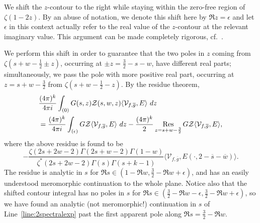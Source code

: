 We shift the $z$-contour to the right while staying within the zero-free region of
$\zeta(1 - 2z)$.
By an abuse of notation, we denote this shift here by $\Re z = \epsilon$ and let
$\epsilon$ in this context actually refer to the real value of the $z$-contour at the
relevant imaginary value.
This argument can be made completely rigorous, cf.~\cite[p. 481-483]{HoffsteinHulse13}.


We perform this shift in order to guarantee that the two poles in $z$ coming from $\zeta(s
+ w - \tfrac{1}{2} \pm z)$, occurring at $\pm z = \tfrac{3}{2} - s - w$, have different
real parts; simultaneously, we pass the pole with more positive real part, occurring at
$z = s + w - \frac{3}{2}$ from $\zeta(s + w - \tfrac{1}{2} - z)$.
By the residue theorem,
\begin{align}\label{eq:FEfirstpart}
  &\frac{(4\pi)^k}{4\pi i} \int_{(0)}G(s,z) \mathcal{Z}(s,w,z) \langle
  \mathcal{V}_{f,\overline{g} }, E\rangle  \ dz \\
  &= \frac{(4\pi)^k}{4\pi i}\int_{(\epsilon)} G \mathcal{Z} \langle
  \mathcal{V}_{f,\overline{g} }, E \rangle \  dz - \frac{(4\pi)^k}{2}\operatorname*{Res}_{z = s + w -
  \frac{3}{2}} G \mathcal{Z} \langle \mathcal{V}_{f,\overline{g} }, E\rangle \nonumber,
\end{align}
where the above residue is found to be
\begin{equation}\label{eq:FEfirstresidue}
  -\frac{\zeta(2s + 2w - 2)\Gamma(2s + w -
  2)\Gamma(1-w)}{\zeta^*(2s+2w-2)\Gamma(s)\Gamma(s + k - 1)}\langle
\mathcal{V}_{f,\overline{g} }, E(\cdot, 2-\overline{s}-\overline{w})\rangle.
\end{equation}
The residue is analytic in $s$ for $\Re s \in (1 - \Re w, \tfrac{3}{2} - \Re w +
\epsilon)$, and has an easily understood meromorphic continuation to the whole plane.
Notice also that the shifted contour integral has no poles in $s$ for $\Re s \in
(\tfrac{3}{2} - \Re w - \epsilon, \tfrac{3}{2} - \Re w + \epsilon)$, so we have found an
analytic (not meromorphic!) continuation in $s$ of Line~\eqref{line:2spectralexp} past the
first apparent pole along $\Re s = \frac{3}{2} - \Re w$.



